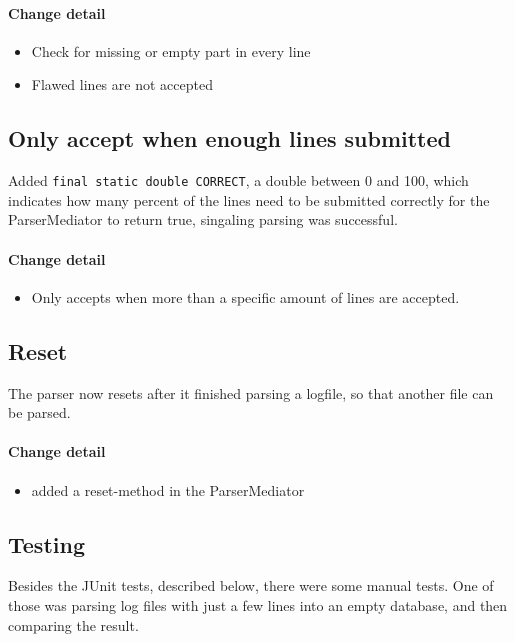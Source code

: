 \paragraph{Change detail}
\begin{itemize}
  \item Check for missing or empty part in every line
  \item Flawed lines are not accepted
\end{itemize}

\subsection{Only accept when enough lines submitted}
Added \texttt{final static double CORRECT}, a double between 0 and 100, which indicates how many percent of the lines need to be
submitted correctly for the ParserMediator to return true, singaling parsing was successful.

\paragraph{Change detail}
\begin{itemize}
  \item Only accepts when more than a specific amount of lines are accepted.
\end{itemize}

\subsection{Reset}
The parser now resets after it finished parsing a logfile, so that another file can be parsed.

\paragraph{Change detail}
\begin{itemize}
  \item added a reset-method in the ParserMediator
\end{itemize}


\subsection{Testing}

Besides the JUnit tests, described below, there were some manual tests. One of those was parsing log files with
just a few lines into an empty database, and then comparing the result.

